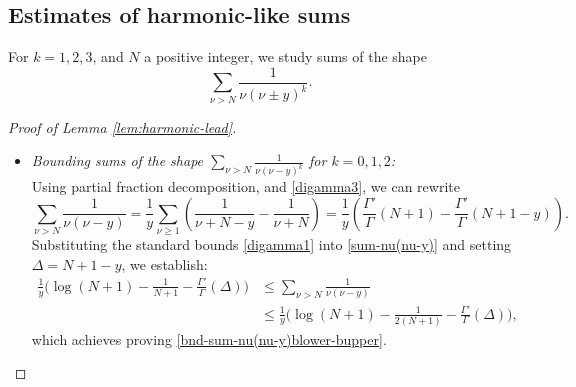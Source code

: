 \documentclass[11pt,letterpaper,oneside,reqno]{amsart}
\renewcommand{\^}[1]{\widehat{#1}}
\numberwithin{equation}{section}
\theoremstyle{remark}
\begin{document}
\subsection{Estimates of harmonic-like sums}
For $k=1,2,3$, and $N$ a positive integer, we study sums of the shape
\[
\sum_{\nu>N} \frac{1}{\nu(\nu\pm y)^k} .
\]
\begin{proof}[Proof of Lemma \ref{lem:harmonic-lead}]\ 
\begin{itemize}
\item{\it Bounding sums of the shape $\sum_{\nu>N}\frac{1}{\nu(\nu-y)^k} $ for $k=0,1,2$:}\\
Using partial fraction decomposition, 
and \eqref{digamma3}, we can rewrite
\begin{equation}\label{sum-nu(nu-y)}
\sum_{\nu>N}\frac{1}{\nu(\nu-y)} 
= \frac1{y} \sum_{\nu  \geq 1 } \left(\frac1{\nu+N-y}-\frac1{\nu+N}\right) 
= \frac1y \left( \frac{\Gamma'}{\Gamma}(N+1)-\frac{\Gamma'}{\Gamma}(N+1-y)\right).  
\end{equation}
Substituting the standard bounds \eqref{digamma1} into \eqref{sum-nu(nu-y)} and setting $\Delta = N+1-y$, we establish:
\begin{equation}
\begin{split}\label{sum-nu(nu-y)-b}
    \frac{1}{y} \Big( \log(N+1)-\frac{1}{N+1} - \frac{\Gamma'}{\Gamma}(\Delta)\Big)  &\leq \sum_{\nu>N}\frac{1}{\nu(\nu-y)} \\&
    \leq \frac{1}{y} \Big( \log(N+1)-\frac{1}{2(N+1)} - \frac{\Gamma'}{\Gamma}(\Delta)\Big),
\end{split}   
\end{equation}
which achieves proving \eqref{bnd-sum-nu(nu-y)blower-bupper}.


\end{itemize}
\end{proof}
\end{document}
